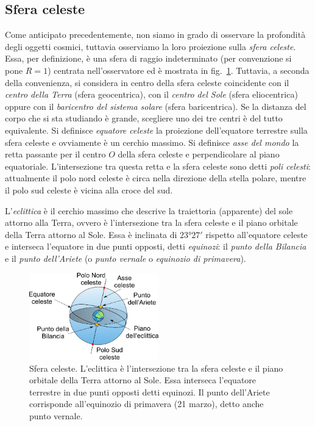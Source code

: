 \subsection{Sfera celeste}\label{sec:posizione-sfera-celeste}
Come anticipato precedentemente, non siamo in grado di osservare la profondità degli oggetti cosmici, tuttavia osserviamo la loro proiezione sulla \emph{sfera celeste}. Essa, per definizione, è una sfera di raggio indeterminato (per convenzione si pone $R=1$) centrata nell'osservatore ed è mostrata in fig.~\ref{fig:sfera-celeste}. Tuttavia, a seconda della convenienza, si considera in centro della sfera celeste coincidente con il \emph{centro della Terra} (sfera geocentrica), con il \emph{centro del Sole} (sfera eliocentrica) oppure con il \emph{baricentro del sistema solare} (sfera baricentrica). Se la distanza del corpo che si sta studiando è grande, scegliere uno dei tre centri è del tutto equivalente. Si definisce \emph{equatore celeste} la proiezione dell'equatore terrestre sulla sfera celeste e ovviamente è un cerchio massimo. Si definisce \emph{asse del mondo} la retta passante per il centro $O$ della sfera celeste e perpendicolare al piano equatoriale. L'intersezione tra questa retta e la sfera celeste sono detti \emph{poli celesti}: attualmente il polo nord celeste è circa nella direzione della stella polare, mentre il polo sud celeste è vicina alla croce del sud. 

L'\emph{eclittica} è il cerchio massimo che descrive la traiettoria (apparente) del sole attorno alla Terra, ovvero è l'intersezione tra la sfera celeste e il piano orbitale della Terra attorno al Sole. Essa è inclinata di $\ang{23;27;}$ rispetto all'equatore celeste e interseca l'equatore in due punti opposti, detti \emph{equinozi}: il \emph{punto della Bilancia} e il \emph{punto dell'Ariete} (o \emph{punto vernale} o \emph{equinozio di primavera}).

\begin{figure}
\centering
\includegraphics[width=0.5\textwidth]{immagini/sfera-celeste.png}
\caption{Sfera celeste. L'eclittica è l'intersezione tra la sfera celeste e il piano orbitale della Terra attorno al Sole. Essa interseca l'equatore terrestre in due punti opposti detti equinozi. Il punto dell'Ariete corrisponde all'equinozio di primavera (21 marzo), detto anche punto vernale.}
\label{fig:sfera-celeste}
\end{figure}


